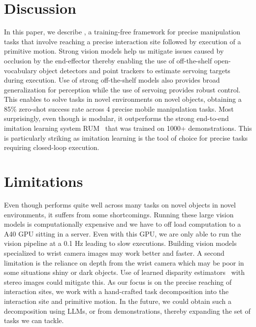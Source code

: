 \section{Discussion}
In this paper, we describe \name, a training-free framework for precise
manipulation tasks that involve reaching a precise interaction site followed by
execution of a primitive motion. Strong vision models help us mitigate issues
caused by occlusion by the end-effector thereby enabling the use of
off-the-shelf open-vocabulary object detectors and point trackers to estimate
servoing targets during execution. 
Use of strong off-the-shelf models also provides broad generalization for perception while the use of servoing provides robust control.
This enables \name to solve tasks in novel environments on novel objects,
obtaining a 85\% zero-shot success rate across 4 precise mobile manipulation
tasks. Most surprisingly, even though \name is modular, it outperforms the
strong end-to-end imitation learning system RUM~\cite{etukuru2024robot} that was
trained on 1000+ demonstrations. This is particularly striking as imitation learning is the tool of choice for precise tasks requiring closed-loop execution. 




\section{Limitations} Even though \name performs quite well across many
tasks on novel objects in novel environments, it suffers from some
shortcomings. Running these large vision models is computationally expensive
and we have to off load computation to a A40 GPU sitting in a server. Even with
this GPU, we are only able to run the vision pipeline at a 0.1 Hz
leading to slow executions. 
Building vision models specialized to wrist camera images may work better and
faster.
A second limitation is the reliance on depth from the wrist camera which may
be poor in some situations \eg shiny or dark objects. Use of learned
disparity estimators~\cite{xu2023iterative} with stereo images could
mitigate this. As our focus is on the precise reaching of interaction sites,
we work with a hand-crafted task decomposition into the interaction site and
primitive motion. In the future, we could obtain such a decomposition using
LLMs, or from demonstrations, thereby expanding the set of tasks we can tackle.
